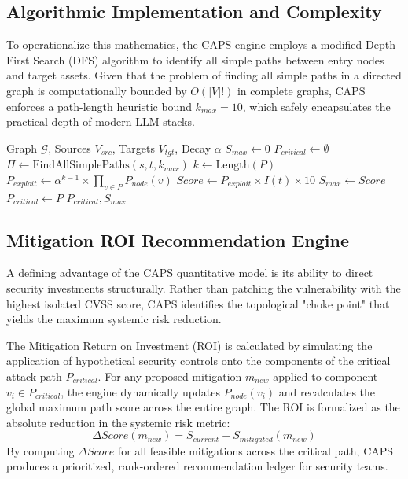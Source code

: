 \subsection{Algorithmic Implementation and Complexity}
To operationalize this mathematics, the CAPS engine employs a modified Depth-First Search (DFS) algorithm to identify all simple paths between entry nodes and target assets. Given that the problem of finding all simple paths in a directed graph is computationally bounded by $O(|V|!)$ in complete graphs, CAPS enforces a path-length heuristic bound $k_{max} = 10$, which safely encapsulates the practical depth of modern LLM stacks.

\begin{algorithm}[h]
\caption{CAPS Critical Path Discovery}
\label{alg:caps}
\begin{algorithmic}[1]
\REQUIRE Graph $\mathcal{G}$, Sources $V_{src}$, Targets $V_{tgt}$, Decay $\alpha$
\STATE $S_{max} \leftarrow 0$
\STATE $P_{critical} \leftarrow \emptyset$
        \STATE $\Pi \leftarrow \text{FindAllSimplePaths}(s, t, k_{max})$
            \STATE $k \leftarrow \text{Length}(P)$
            \STATE $P_{exploit} \leftarrow \alpha^{k-1} \times \prod_{v \in P} P_{node}(v)$
            \STATE $Score \leftarrow P_{exploit} \times I(t) \times 10$
                \STATE $S_{max} \leftarrow Score$
                \STATE $P_{critical} \leftarrow P$
            \ENDIF
        \ENDFOR
    \ENDFOR
\ENDFOR
\RETURN $P_{critical}, S_{max}$
\end{algorithmic}
\end{algorithm}

\subsection{Mitigation ROI Recommendation Engine}
A defining advantage of the CAPS quantitative model is its ability to direct security investments structurally. Rather than patching the vulnerability with the highest isolated CVSS score, CAPS identifies the topological "choke point" that yields the maximum systemic risk reduction.

The Mitigation Return on Investment (ROI) is calculated by simulating the application of hypothetical security controls onto the components of the critical attack path $P_{critical}$. For any proposed mitigation $m_{new}$ applied to component $v_i \in P_{critical}$, the engine dynamically updates $P_{node}(v_i)$ and recalculates the global maximum path score across the entire graph. The ROI is formalized as the absolute reduction in the systemic risk metric:
\begin{equation}
\Delta Score(m_{new}) = S_{current} - S_{mitigated}(m_{new})
\end{equation}
By computing $\Delta Score$ for all feasible mitigations across the critical path, CAPS produces a prioritized, rank-ordered recommendation ledger for security teams. 

